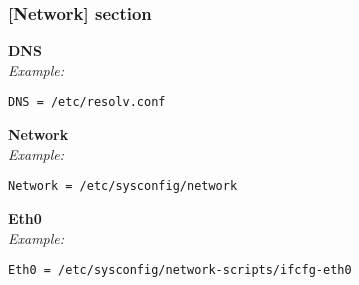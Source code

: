 \subsubsection{[Network] section}
{\bfseries DNS}\\
\textit{Example:}
\begin{lstlisting}
DNS = /etc/resolv.conf
\end{lstlisting}

{\bfseries Network}\\
\textit{Example:}
\begin{lstlisting}
Network = /etc/sysconfig/network
\end{lstlisting}

{\bfseries Eth0}\\
\textit{Example:}
\begin{lstlisting}
Eth0 = /etc/sysconfig/network-scripts/ifcfg-eth0
\end{lstlisting}

